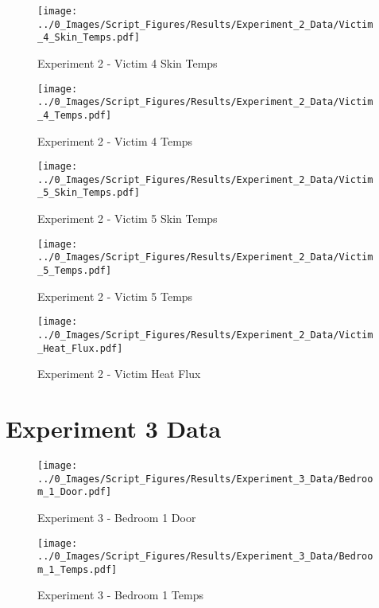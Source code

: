 	\begin{figure}[H]
		\centering
		\texttt{[image: ../0\_Images/Script\_Figures/Results/Experiment\_2\_Data/Victim\_4\_Skin\_Temps.pdf]}
		\caption[]{Experiment 2 - Victim 4 Skin Temps}
	\end{figure}
 
	\clearpage

	\begin{figure}[H]
		\centering
		\texttt{[image: ../0\_Images/Script\_Figures/Results/Experiment\_2\_Data/Victim\_4\_Temps.pdf]}
		\caption[]{Experiment 2 - Victim 4 Temps}
	\end{figure}
 

	\begin{figure}[H]
		\centering
		\texttt{[image: ../0\_Images/Script\_Figures/Results/Experiment\_2\_Data/Victim\_5\_Skin\_Temps.pdf]}
		\caption[]{Experiment 2 - Victim 5 Skin Temps}
	\end{figure}
 
	\clearpage

	\begin{figure}[H]
		\centering
		\texttt{[image: ../0\_Images/Script\_Figures/Results/Experiment\_2\_Data/Victim\_5\_Temps.pdf]}
		\caption[]{Experiment 2 - Victim 5 Temps}
	\end{figure}
 

	\begin{figure}[H]
		\centering
		\texttt{[image: ../0\_Images/Script\_Figures/Results/Experiment\_2\_Data/Victim\_Heat\_Flux.pdf]}
		\caption[]{Experiment 2 - Victim Heat Flux}
	\end{figure}
 
	\clearpage

\clearpage		\large
\section{Experiment 3 Data} \label{App:Exp3Results} 

	\begin{figure}[H]
		\centering
		\texttt{[image: ../0\_Images/Script\_Figures/Results/Experiment\_3\_Data/Bedroom\_1\_Door.pdf]}
		\caption[]{Experiment 3 - Bedroom 1 Door}
	\end{figure}
 

	\begin{figure}[H]
		\centering
		\texttt{[image: ../0\_Images/Script\_Figures/Results/Experiment\_3\_Data/Bedroom\_1\_Temps.pdf]}
		\caption[]{Experiment 3 - Bedroom 1 Temps}
	\end{figure}
 
